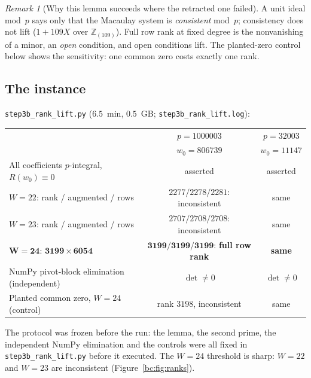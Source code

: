 \documentclass[a4paper,11pt]{article}
\theoremstyle{plain}
\theoremstyle{definition}
\theoremstyle{remark}
\newtheorem{remark}[theorem]{Remark}
\begin{document}
\begin{remark}[Why this lemma succeeds where the retracted one failed]
A unit ideal mod~$p$ says only that the Macaulay system is \emph{consistent} mod~$p$; consistency does not lift ($1+109X$ over $\mathbb{Z}_{(109)}$). Full row rank at fixed degree is the nonvanishing of a minor, an \emph{open} condition, and open conditions lift. The planted-zero control below shows the sensitivity: one common zero costs exactly one rank.
\end{remark}

\subsection{The instance}

\texttt{step3b\_rank\_lift.py} ($6.5$~min, $0.5$~GB; \texttt{step3b\_rank\_lift.log}):

{\small
\begin{center}
\begin{tabular}{lcc}
\toprule
 & $p=1000003$ & $p=32003$ \\
 & $w_0=806739$ & $w_0=11147$ \\
\midrule
All coefficients $p$-integral, $R(w_0)\equiv0$ & asserted & asserted \\
$W=22$: rank / augmented / rows & $2277/2278/2281$: inconsistent & same \\
$W=23$: rank / augmented / rows & $2707/2708/2708$: inconsistent & same \\
$\mathbf{W=24}$: $\mathbf{3199\times6054}$ & $\mathbf{3199/3199/3199}$: \textbf{full row rank} & \textbf{same} \\
NumPy pivot-block elimination (independent) & $\det\ne0$ & $\det\ne0$ \\
Planted common zero, $W=24$ (control) & rank $3198$, inconsistent & same \\
\bottomrule
\end{tabular}
\end{center}
}

The protocol was frozen before the run: the lemma, the second prime, the independent NumPy elimination and the controls were all fixed in \texttt{step3b\_rank\_lift.py} before it executed. The $W=24$ threshold is sharp: $W=22$ and $W=23$ are inconsistent (Figure~\ref{bc:fig:ranks}).
\end{document}

